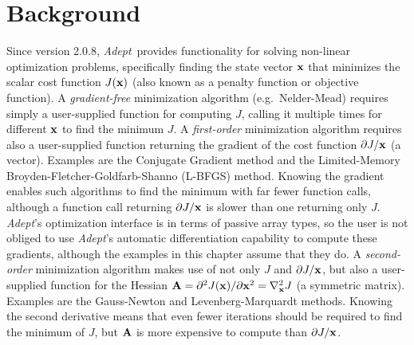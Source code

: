 \documentclass[a4,oneside]{book}
\def\Adept{\emph{Adept}}
\begin{document}
\section{Background}
Since version 2.0.8, \Adept\ provides functionality for solving
non-linear optimization problems, specifically finding the state
vector ${\bf x}$ that minimizes the scalar cost function $J({\bf
  x})$ (also known as a penalty function or objective function).
%
A \emph{gradient-free} minimization algorithm (e.g.\ Nelder-Mead)
requires simply a user-supplied function for computing $J$, calling it
multiple times for different ${\bf x}$ to find the minimum $J$.
%
A \emph{first-order} minimization algorithm requires also a
user-supplied function returning the gradient of the cost function
$\partial J/{\bf x}$ (a vector). Examples are the Conjugate Gradient
method and the Limited-Memory Broyden-Fletcher-Goldfarb-Shanno
(L-BFGS) method. Knowing the gradient enables such algorithms to find
the minimum with far fewer function calls, although a function call
returning $\partial J/{\bf x}$ is slower than one returning only
$J$. \Adept's optimization interface is in terms of passive array
types, so the user is not obliged to use \Adept's automatic
differentiation capability to compute these gradients, although the
examples in this chapter assume that they do.
%
A \emph{second-order} minimization algorithm makes use of not only $J$
and $\partial J/{\bf x}$, but also a user-supplied function for the
Hessian ${\bf A}=\partial^2J({\bf x})/\partial{\bf x}^2=\nabla_{\bf
  x}^2J$ (a symmetric matrix).  Examples are the Gauss-Newton and
Levenberg-Marquardt methods. Knowing the second derivative means that
even fewer iterations should be required to find the minimum of $J$,
but ${\bf A}$ is more expensive to compute than $\partial J/{\bf x}$.
\end{document}
